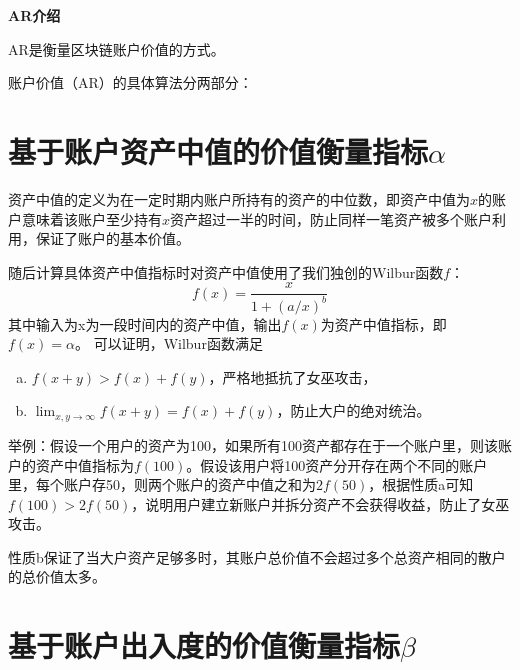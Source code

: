 \documentclass[12pt]{article}
\begin{document}
\pagestyle{empty}
\renewcommand{\contentsname}{目录}
\renewcommand{\abstractname}{摘要}
\renewcommand{\refname}{发表文献}
\renewcommand{\figurename}{图}
\renewcommand{\tablename}{表}
\renewcommand{\baselinestretch}{1.5}
\renewcommand{\appendixname}{附录}
\renewcommand{\proofname}{证明}

\pagecolor{\pcolor}


  \begin{center}
    \vspace*{0.5cm}
    \vspace{0.5cm}
    \textbf{\huge{AR介绍}}
    \vspace{0.5cm}
    \textbf{}
  \end{center}
\setcounter{page}{0}
\pagestyle{fancy}
\vspace*{0.01cm}
AR是衡量区块链账户价值的方式。

\noindent 账户价值（AR）的具体算法分两部分：
\section*{	基于账户资产中值的价值衡量指标$\alpha$}

资产中值的定义为在一定时期内账户所持有的资产的中位数，即资产中值为$x$的账户意味着该账户至少持有$x$资产超过一半的时间，防止同样一笔资产被多个账户利用，保证了账户的基本价值。

随后计算具体资产中值指标时对资产中值使用了我们独创的Wilbur函数$f$：
$$f(x)=\frac{x}{1+(a/x)^b}$$
其中输入为x为一段时间内的资产中值，输出$f(x)$为资产中值指标，即$f(x)= \alpha$。
可以证明，Wilbur函数满足
\begin{enumerate}[(a)]
\item $ f(x+y)>f(x)+f(y)$，严格地抵抗了女巫攻击，
\item $\lim_{x,y\rightarrow \infty} f(x+y)=f(x)+f(y)$，防止大户的绝对统治。
\end{enumerate}
举例：假设一个用户的资产为100，如果所有100资产都存在于一个账户里，则该账户的资产中值指标为$f(100)$。假设该用户将100资产分开存在两个不同的账户里，每个账户存50，则两个账户的资产中值之和为$2f(50)$，根据性质a可知$f(100)>2f(50)$，说明用户建立新账户并拆分资产不会获得收益，防止了女巫攻击。

性质b保证了当大户资产足够多时，其账户总价值不会超过多个总资产相同的散户的总价值太多。
\section*{基于账户出入度的价值衡量指标$\beta$}
\end{document}
